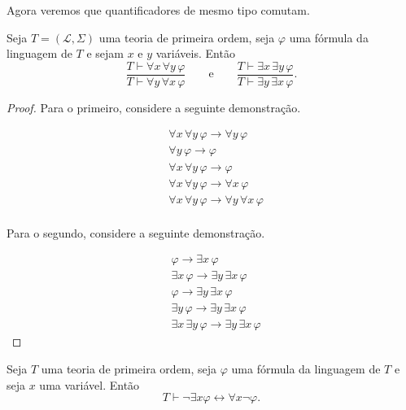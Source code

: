 Agora veremos que quantificadores de mesmo tipo comutam.

\begin{metalemma}\label{mlem:comutatividadeQuantificadoresMesmoTipo}
    Seja $T=(\mathcal L,\Sigma)$ uma teoria de primeira ordem, seja $\varphi$ uma fórmula da linguagem de $T$ e sejam $x$ e $y$ variáveis.
    Então
    \[
        \frac{T\vdash \forall x\,\forall y\,\varphi}
             {T\vdash \forall y\,\forall x\,\varphi}
        \qquad \text{e} \qquad
        \frac{T\vdash \exists x\,\exists y\,\varphi}
             {T\vdash \exists y\,\exists x\,\varphi}.
    \]
\end{metalemma}
\begin{proof}
    Para o primeiro, considere a seguinte demonstração.

    \begin{align*}
        &\forall x\,\forall y\,\varphi\rightarrow \forall y\,\varphi \tag{FO14}\\
        &\forall y\,\varphi\rightarrow \varphi \tag{FO14}\\
        &\forall x\,\forall y\,\varphi\rightarrow \varphi \tag{transitividade de $\rightarrow$}\\
        &\forall x\,\forall y\,\varphi\rightarrow \forall x\,\varphi \tag{Introdução de $\forall$}\\
        &\forall x\,\forall y\,\varphi\rightarrow \forall y\,\forall x\,\varphi \tag{Introdução de $\forall$}\\
    \end{align*}

    Para o segundo, considere a seguinte demonstração.

    \begin{align*}
        &\varphi\rightarrow \exists x\,\varphi \tag{FO15}\\
        &\exists x\,\varphi\rightarrow \exists y\,\exists x\,\varphi \tag{FO15}\\
        &\varphi\rightarrow \exists y\,\exists x\,\varphi \tag{transitividade de $\rightarrow$}\\
        &\exists y\,\varphi\rightarrow \exists y\,\exists x\,\varphi \tag{Introdução de $\exists$}\\
        &\exists x\,\exists y\,\varphi\rightarrow \exists y\,\exists x\,\varphi \tag{Introdução de $\exists$}
    \end{align*}
\end{proof}

\begin{metaproposition}\label{mprop:negacaoQuantificadores}
    Seja $T$ uma teoria de primeira ordem, seja $\varphi$ uma fórmula da linguagem de $T$ e seja $x$ uma variável.
    Então
    \[
        T\vdash \neg\exists x\varphi \leftrightarrow \forall x\neg\varphi.
    \]
\end{metaproposition}


